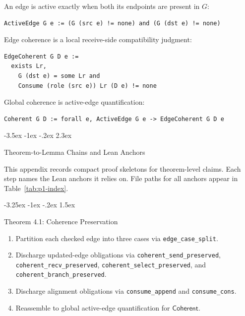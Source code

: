 \documentclass[a4paper,10pt,twocolumn,english]{article}
\makeatletter
\renewcommand{\section}{\@startsection{section}{1}{\z@}%
  {-3.5ex \@plus -1ex \@minus -.2ex}%
  {2.3ex}%
  {\raggedright\normalfont\large\bfseries}}
\renewcommand{\subsection}{\@startsection{subsection}{2}{\z@}%
  {-3.25ex \@plus -1ex \@minus -.2ex}%
  {1.5ex}%
  {\raggedright\normalfont\normalsize\bfseries}}
\numberwithin{equation}{section}
\theoremstyle{paperdef}
\theoremstyle{paperplain}
\theoremstyle{paperdef}
\theoremstyle{paperremark}
\newcommand{\Coherent}{\ensuremath{\mathsf{Coherent}}}
\makeatother
\begin{document}
An edge is active exactly when both its endpoints are present in $G$:

\noindent\begin{minipage}{\columnwidth}
	\begin{lstlisting}
ActiveEdge G e := (G (src e) != none) and (G (dst e) != none)
\end{lstlisting}
\end{minipage}

Edge coherence is a local receive-side compatibility judgment:

\noindent\begin{minipage}{\columnwidth}
	\begin{lstlisting}
EdgeCoherent G D e :=
  exists Lr,
    G (dst e) = some Lr and
    Consume (role (src e)) Lr (D e) != none
\end{lstlisting}
\end{minipage}

Global coherence is active-edge quantification:

\noindent\begin{minipage}{\columnwidth}
	\begin{lstlisting}
Coherent G D := forall e, ActiveEdge G e -> EdgeCoherent G D e
\end{lstlisting}
\end{minipage}

\section{Theorem-to-Lemma Chains and Lean Anchors}
\label{app:chains}

This appendix records compact proof skeletons for theorem-level claims. Each step names the Lean anchors it relies on. File paths for all anchors appear in Table~\ref{tab:p1-index}.

\subsection{Theorem 4.1: Coherence Preservation}

\begin{enumerate}
	\item Partition each checked edge into three cases via \nolinkurl{edge_case_split}.
	\item Discharge updated-edge obligations via \nolinkurl{coherent_send_preserved}, \nolinkurl{coherent_recv_preserved}, \nolinkurl{coherent_select_preserved}, and \nolinkurl{coherent_branch_preserved}.
	\item Discharge alignment obligations via \nolinkurl{consume_append} and \nolinkurl{consume_cons}.
	\item Reassemble to global active-edge quantification for \Coherent.
\end{enumerate}
\end{document}
